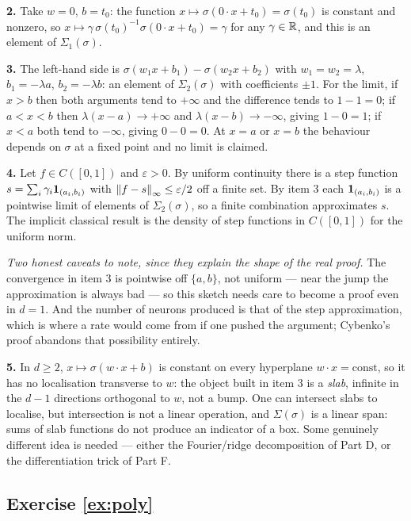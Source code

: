\documentclass[11pt,a4paper]{article}
\begin{document}
\textbf{2.} Take $w = 0$, $b = t_0$: the function $x \mapsto \sigma(0\cdot x + t_0) = \sigma(t_0)$
is constant and nonzero, so $x \mapsto \gamma\,\sigma(t_0)^{-1}\sigma(0\cdot x + t_0) = \gamma$ for
any $\gamma\in\mathbb{R}$, and this is an element of $\Sigma_1(\sigma)$.

\textbf{3.} The left-hand side is $\sigma(w_1x+b_1) - \sigma(w_2x+b_2)$ with $w_1 = w_2 = \lambda$,
$b_1 = -\lambda a$, $b_2 = -\lambda b$: an element of $\Sigma_2(\sigma)$ with coefficients $\pm1$.
For the limit, if $x > b$ then both arguments tend to $+\infty$ and the difference tends to
$1 - 1 = 0$; if $a < x < b$ then $\lambda(x-a)\to+\infty$ and $\lambda(x-b)\to-\infty$, giving
$1 - 0 = 1$; if $x < a$ both tend to $-\infty$, giving $0 - 0 = 0$. At $x = a$ or $x=b$ the
behaviour depends on $\sigma$ at a fixed point and no limit is claimed.

\textbf{4.} Let $f \in C([0,1])$ and $\varepsilon > 0$. By uniform continuity there is a step
function $s = \sum_{i} \gamma_i \mathbf{1}_{(a_i,b_i)}$ with $\left\lVert f - s \right\rVert_\infty \le \varepsilon/2$ off a
finite set. By item 3 each $\mathbf{1}_{(a_i,b_i)}$ is a pointwise limit of elements of
$\Sigma_2(\sigma)$, so a finite combination approximates $s$. The implicit classical result is the
density of step functions in $C([0,1])$ for the uniform norm.

\emph{Two honest caveats to note, since they explain the shape of the real proof.} The convergence
in item 3 is pointwise off $\{a,b\}$, not uniform --- near the jump the approximation is always
bad --- so this sketch needs care to become a proof even in $d=1$. And the number of neurons
produced is that of the step approximation, which is where a rate would come from if one pushed the
argument; Cybenko's proof abandons that possibility entirely.

\textbf{5.} In $d \ge 2$, $x \mapsto \sigma(w\cdot x + b)$ is constant on every hyperplane
$w\cdot x = \text{const}$, so it has no localisation transverse to $w$: the object built in item 3
is a \emph{slab}, infinite in the $d-1$ directions orthogonal to $w$, not a bump. One can intersect
slabs to localise, but intersection is not a linear operation, and $\Sigma(\sigma)$ is a linear
span: sums of slab functions do not produce an indicator of a box. Some genuinely different idea is
needed --- either the Fourier/ridge decomposition of Part D, or the differentiation trick of Part F.

\subsection*{Exercise \ref{ex:poly}}
\end{document}
